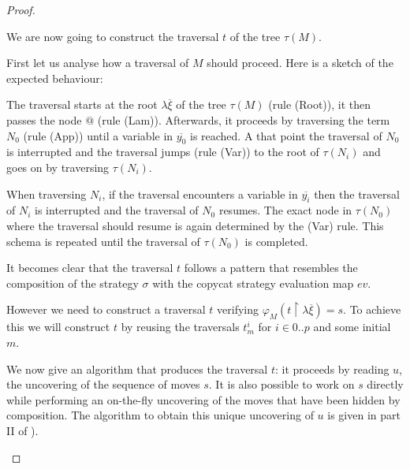 \begin{proof}
\begin{itemize}
%
%





    We are now going to construct the traversal $t$ of the
    tree $\tau(M)$.

    First let us analyse how a traversal of $M$ should proceed.
    Here is a sketch of the expected behaviour:

    The traversal starts at the root $\lambda \overline{\xi}$ of the tree $\tau(M)$ (rule
    (Root)), it then passes the node $@$ (rule (Lam)). Afterwards, it proceeds by traversing the term $N_0$ (rule (App))
    until a variable in $\overline{y_0}$ is reached. A that point the traversal
    of $N_0$ is interrupted and the traversal jumps (rule (Var)) to the root of $\tau(N_i)$ and goes on by traversing $\tau(N_i)$.

    When traversing $N_i$, if the traversal encounters a variable in $\overline{y_i}$ then the traversal of $N_i$ is interrupted and
    the traversal of $N_0$ resumes. The exact node in $\tau(N_0)$ where the traversal should resume is again determined by the (Var) rule.
    This schema is repeated until the traversal of $\tau(N_0)$ is completed.

    It becomes clear that the traversal $t$ follows a pattern that resembles the composition of the strategy $\sigma$
    with the copycat strategy evaluation map $ev$.

    However we need to construct a traversal $t$ verifying $\varphi_M(t \upharpoonright \lambda \overline{\xi}) =
    s$. To achieve this we will construct $t$ by reusing the traversals $t^i_m$ for $i \in 0..p$ and some initial $m$.


    We now give an algorithm that produces the traversal $t$: it proceeds by reading $u$, the uncovering of the sequence of moves $s$.
    It is also possible to work on $s$ directly while performing an on-the-fly uncovering of the moves that have been hidden by
    composition. The algorithm to obtain this unique uncovering of $u$ is given in part II of \cite{hylandong_pcf}).


\end{itemize}
\end{proof}
